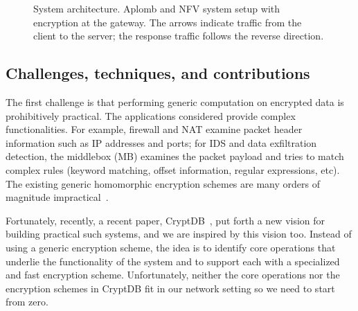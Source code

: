 \begin{figure}[t!]
\centering
{}
%
\hfill  
{}
     
\caption{System architecture. Aplomb and NFV system setup with \sys encryption  at the gateway. The arrows indicate traffic from the client to the server; the response traffic follows the reverse direction. \label{fig:sys-overview}}
\end{figure}


    \subsection{Challenges, techniques, and contributions}
    
The first challenge is that performing generic computation on encrypted data is prohibitively practical. The applications considered provide complex functionalities. For example, firewall and NAT examine packet header information such as IP addresses and ports; for IDS and data exfiltration detection, the middlebox (MB) examines the packet payload and tries to match complex rules (keyword matching, offset information,  regular expressions, etc). The existing generic homomorphic encryption schemes are many orders of magnitude impractical~\cite{aesFHE}.

Fortunately, recently, a recent paper, CryptDB~\cite{popa:cryptdb}, put forth a new vision for building practical such systems, and we are inspired by this vision too. Instead of using a generic encryption scheme, the idea is to identify core operations that underlie the functionality of the system and to support each with a specialized and fast encryption scheme. Unfortunately, neither the core operations nor the encryption schemes in CryptDB fit in our network setting so we need to start from zero.

